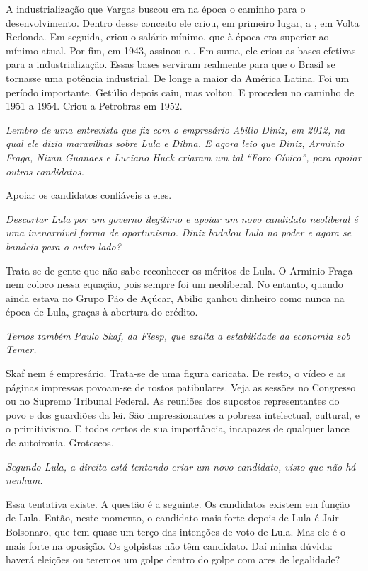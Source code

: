\normalfont
A industrialização que Vargas buscou era na época o
caminho para o desenvolvimento. Dentro desse conceito ele criou, em
primeiro lugar, a , em Volta Redonda. Em seguida, criou o salário
mínimo, que à época era superior ao mínimo atual. Por fim, em 1943,
assinou a . Em suma, ele criou as bases efetivas para a
industrialização. Essas bases serviram realmente para que o Brasil se
tornasse uma potência industrial. De longe a maior da América Latina.
Foi um período importante. Getúlio depois caiu, mas voltou. E procedeu
no caminho de 1951 a 1954. Criou a Petrobras em 1952.

\itshape
 Lembro de uma entrevista que fiz com o empresário
Abilio Diniz, em 2012, na qual ele dizia maravilhas sobre Lula e Dilma.
E agora leio que Diniz, Arminio Fraga, Nizan Guanaes e Luciano Huck
criaram um tal ``Foro Cívico'', para apoiar outros candidatos.

\normalfont
Apoiar os candidatos confiáveis a eles.

\itshape
 Descartar Lula por um governo ilegítimo e apoiar um
novo candidato neoliberal é uma inenarrável forma de oportunismo. Diniz
badalou Lula no poder e agora se bandeia para o outro lado?

\normalfont
Trata-se de gente que não sabe reconhecer os méritos de
Lula. O Arminio Fraga nem coloco nessa equação, pois sempre foi um
neoliberal. No entanto, quando ainda estava no Grupo Pão de Açúcar,
Abilio ganhou dinheiro como nunca na época de Lula, graças à abertura do
crédito.

\itshape
 Temos também Paulo Skaf, da Fiesp, que exalta a
estabilidade da economia sob Temer.

\normalfont
Skaf nem é empresário. Trata-se de uma figura caricata.
De resto, o vídeo e as páginas impressas povoam-se de rostos
patibulares. Veja as sessões no Congresso ou no Supremo Tribunal
Federal. As reuniões dos supostos representantes do povo e dos guardiões
da lei. São impressionantes a pobreza intelectual, cultural, e o
primitivismo. E todos certos de sua importância, incapazes de qualquer
lance de autoironia. Grotescos.

\itshape
 Segundo Lula, a direita está tentando criar um novo
candidato, visto que não há nenhum.

\normalfont
Essa tentativa existe. A questão é a seguinte. Os
candidatos existem em função de Lula. Então, neste momento, o candidato
mais forte depois de Lula é Jair Bolsonaro, que tem quase um terço das
intenções de voto de Lula. Mas ele é o mais forte na oposição. Os
golpistas não têm candidato. Daí minha dúvida: haverá eleições ou
teremos um golpe dentro do golpe com ares de legalidade?

